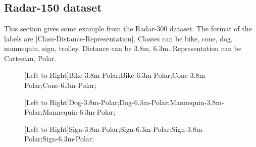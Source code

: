 \chapter{}

\section{Radar-150 dataset}\label{apb}
This section gives some example from the Radar-300 dataset. The format of the labels are [Class-Distance-Representation]. Classes can be {bike, cone, dog, mannequin, sign, trolley}. Distance can be {3.8m, 6.3m}. Representation can be {Cartesian, Polar}.

\begin{figure}[h]
	\centering
	\epsfxsize=7.5cm
	{}{}\caption{[Left to Right]Bike-3.8m-Polar;Bike-6.3m-Polar;Cone-3.8m-Polar;Cone-6.3m-Polar;}
	\label{fig:blocks}
\end{figure} 

\begin{figure}[h]
	\centering
	\epsfxsize=7.5cm
	{}{}\caption{[Left to Right]Dog-3.8m-Polar;Dog-6.3m-Polar;Mannequin-3.8m-Polar;Mannequin-6.3m-Polar;}
	\label{fig:blocks}
\end{figure} 

\begin{figure}[h]
	\centering
	\epsfxsize=7.5cm
	{}{}\caption{[Left to Right]Sign-3.8m-Polar;Sign-6.3m-Polar;Sign-3.8m-Polar;Sign-6.3m-Polar;}
	\label{fig:blocks}
\end{figure} 

